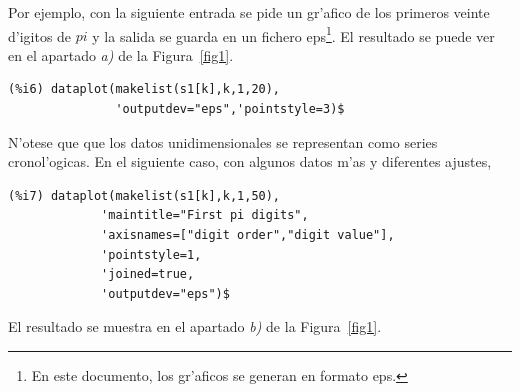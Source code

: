 \documentclass[spanish,12pt,a4paper]{article}
\begin{document}
\begin{description}
Por ejemplo, con la siguiente entrada se pide un gr'afico de los primeros veinte d'igitos de $pi$ y la salida se guarda en un fichero eps\footnote{En este documento, los gr'aficos se generan en formato eps.}. El resultado se puede ver en el apartado \emph{a)} de la Figura~\ref{fig1}.
\begin{verbatim}
(%i6) dataplot(makelist(s1[k],k,1,20),
               'outputdev="eps",'pointstyle=3)$
\end{verbatim}
N'otese que que los datos unidimensionales se representan como series cronol'ogicas. En el siguiente caso, con algunos datos m'as y diferentes ajustes,
\begin{verbatim}
(%i7) dataplot(makelist(s1[k],k,1,50),
             'maintitle="First pi digits",
             'axisnames=["digit order","digit value"],
             'pointstyle=1,
             'joined=true,
             'outputdev="eps")$
\end{verbatim}
El resultado se muestra en el apartado \emph{b)} de la Figura~\ref{fig1}.



\end{description}
\end{document}
